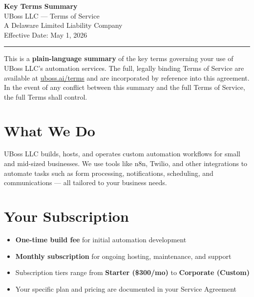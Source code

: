\documentclass[11pt,letterpaper]{scrartcl}
\begin{document}
\begin{center}
    {\LARGE\bfseries\color{charcoal}Key Terms Summary}\\[0.4em]
    {\large\color{accent}UBoss LLC --- Terms of Service}\\[0.3em]
    {\small A Delaware Limited Liability Company}\\[0.2em]
    {\small Effective Date: May 1, 2026}\\[0.5em]
    \textcolor{ruleline}{\rule{0.5\textwidth}{0.6pt}}
\end{center}

\vspace{0.5em}

\begin{tcolorbox}[keyterm, title={What is this document?}]
This is a \textbf{plain-language summary} of the key terms governing your use of UBoss LLC's automation services. The full, legally binding Terms of Service are available at \href{https://uboss.ai/terms}{uboss.ai/terms} and are incorporated by reference into this agreement. In the event of any conflict between this summary and the full Terms of Service, the full Terms shall control.
\end{tcolorbox}

\section{What We Do}

UBoss LLC builds, hosts, and operates custom automation workflows for small and mid-sized businesses. We use tools like n8n, Twilio, and other integrations to automate tasks such as form processing, notifications, scheduling, and communications --- all tailored to your business needs.

\section{Your Subscription}

\begin{tcolorbox}[keyterm, title={Pricing Model}]
\begin{itemize}[nosep, leftmargin=1.5em]
    \item \textbf{One-time build fee} for initial automation development
    \item \textbf{Monthly subscription} for ongoing hosting, maintenance, and support
    \item Subscription tiers range from \textbf{Starter (\$300/mo)} to \textbf{Corporate (Custom)}
    \item Your specific plan and pricing are documented in your Service Agreement
\end{itemize}
\end{tcolorbox}
\end{document}
